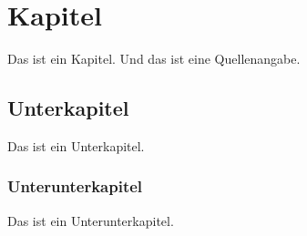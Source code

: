 

\chapter{Kapitel}
Das ist ein Kapitel.
Und das ist eine Quellenangabe\cite{MadeInGermanyLabel}.

\section{Unterkapitel}
Das ist ein Unterkapitel.

\subsection{Unterunterkapitel}
Das ist ein Unterunterkapitel.
